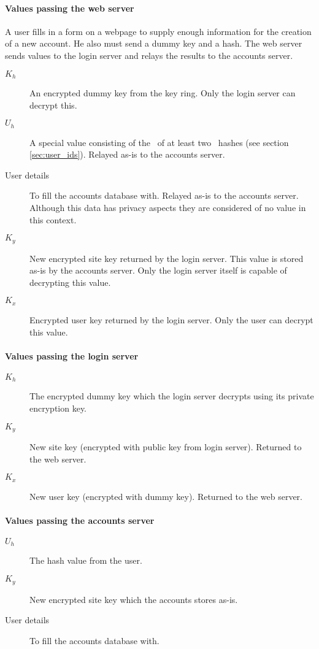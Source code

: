 \paragraph{Values passing the web server}
A user fills in a form on a webpage to supply enough information for the creation of a new account.
He also must send a dummy key and a hash.
The web server sends values to the login server and relays the results to the accounts server.
\begin{description}
\item[$K_h$]	An encrypted dummy key from the key ring.
	Only the login server can decrypt this.
\item[$U_h$]	A special value consisting of the \XOR\ of at least two \SHA\ hashes (see section \ref{sec:user_ids}).
	Relayed as-is to the accounts server.
\item[User details]	To fill the accounts database with.
	Relayed as-is to the accounts server.
	Although this data has privacy aspects they are considered of no value in this context.
\item[$K_y$]	New encrypted site key returned by the login server.
	This value is stored as-is by the accounts server.
	Only the login server itself is capable of decrypting this value.
\item[$K_x$]	Encrypted user key returned by the login server.
	Only the user can decrypt this value.
\end{description}
\paragraph{Values passing the login server}
\begin{description}
\item[$K_h$]	The encrypted dummy key which the login server decrypts using its private encryption key.
\item[$K_y$]	New site key (encrypted with public key from login server).
	Returned to the web server.
\item[$K_x$]	New user key (encrypted with dummy key).
	Returned to the web server.
\end{description}
\paragraph{Values passing the accounts server}
\begin{description}
\item[$U_h$]	The hash value from the user.
\item[$K_y$]	New encrypted site key which the accounts stores as-is.
\item[User details]	To fill the accounts database with.
\end{description}
